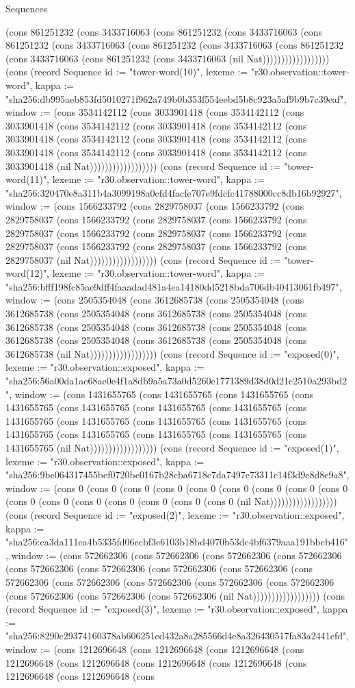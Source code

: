 \begin{lexlean}{Sequences}
\begin{semanticmodule}
{(cons 861251232 (cons 3433716063 (cons 861251232 (cons 3433716063 (cons 861251232 (cons 3433716063 (cons 861251232 (cons 3433716063 (cons 861251232 (cons 3433716063 (cons 861251232 (cons 3433716063 (nil Nat)))))))))))))))))}) (cons (record Sequence {id := "tower-word(10)", lexeme := "r30.observation::tower-word", kappa := "sha256:db995aeb853fd5010271f962a749b0b353f554eebd5b8c923a5af9b9b7c39eaf", window := (cons 3534142112 (cons 3033901418 (cons 3534142112 (cons 3033901418 (cons 3534142112 (cons 3033901418 (cons 3534142112 (cons 3033901418 (cons 3534142112 (cons 3033901418 (cons 3534142112 (cons 3033901418 (cons 3534142112 (cons 3033901418 (cons 3534142112 (cons 3033901418 (nil Nat)))))))))))))))))}) (cons (record Sequence {id := "tower-word(11)", lexeme := "r30.observation::tower-word", kappa := "sha256:320470e8a311b4a3099198a0cfd4facfe707e9fdcfc41788000cc8db16b92927", window := (cons 1566233792 (cons 2829758037 (cons 1566233792 (cons 2829758037 (cons 1566233792 (cons 2829758037 (cons 1566233792 (cons 2829758037 (cons 1566233792 (cons 2829758037 (cons 1566233792 (cons 2829758037 (cons 1566233792 (cons 2829758037 (cons 1566233792 (cons 2829758037 (nil Nat)))))))))))))))))}) (cons (record Sequence {id := "tower-word(12)", lexeme := "r30.observation::tower-word", kappa := "sha256:bfff198fc85ae9dff4faaadad481a4ea14180dd5218bda706db40413061fb497", window := (cons 2505354048 (cons 3612685738 (cons 2505354048 (cons 3612685738 (cons 2505354048 (cons 3612685738 (cons 2505354048 (cons 3612685738 (cons 2505354048 (cons 3612685738 (cons 2505354048 (cons 3612685738 (cons 2505354048 (cons 3612685738 (cons 2505354048 (cons 3612685738 (nil Nat)))))))))))))))))}) (cons (record Sequence {id := "exposed(0)", lexeme := "r30.observation::exposed", kappa := "sha256:56a00da1ae68ae0e4f1a8db9a5a73a0d5260e1771389d38d0d21c2510a293bd2", window := (cons 1431655765 (cons 1431655765 (cons 1431655765 (cons 1431655765 (cons 1431655765 (cons 1431655765 (cons 1431655765 (cons 1431655765 (cons 1431655765 (cons 1431655765 (cons 1431655765 (cons 1431655765 (cons 1431655765 (cons 1431655765 (cons 1431655765 (cons 1431655765 (nil Nat)))))))))))))))))}) (cons (record Sequence {id := "exposed(1)", lexeme := "r30.observation::exposed", kappa := "sha256:9bc064317455bef0720bc0167b28cba6718c7da7497e73311c14f3d9e8d8e9a8", window := (cons 0 (cons 0 (cons 0 (cons 0 (cons 0 (cons 0 (cons 0 (cons 0 (cons 0 (cons 0 (cons 0 (cons 0 (cons 0 (cons 0 (cons 0 (cons 0 (nil Nat)))))))))))))))))}) (cons (record Sequence {id := "exposed(2)", lexeme := "r30.observation::exposed", kappa := "sha256:ca3da111ea4b5335fd06ccbf3e6103b18bd4070b53dc4bf6379aaa191bbcb416", window := (cons 572662306 (cons 572662306 (cons 572662306 (cons 572662306 (cons 572662306 (cons 572662306 (cons 572662306 (cons 572662306 (cons 572662306 (cons 572662306 (cons 572662306 (cons 572662306 (cons 572662306 (cons 572662306 (cons 572662306 (cons 572662306 (nil Nat)))))))))))))))))}) (cons (record Sequence {id := "exposed(3)", lexeme := "r30.observation::exposed", kappa := "sha256:8290c29374160378ab606251ed432a8a285566d4e8a326430517fa83a2441cfd", window := (cons 1212696648 (cons 1212696648 (cons 1212696648 (cons 1212696648 (cons 1212696648 (cons 1212696648 (cons 1212696648 (cons 1212696648 (cons 1212696648 (cons }
\end{semanticmodule}
\end{lexlean}
